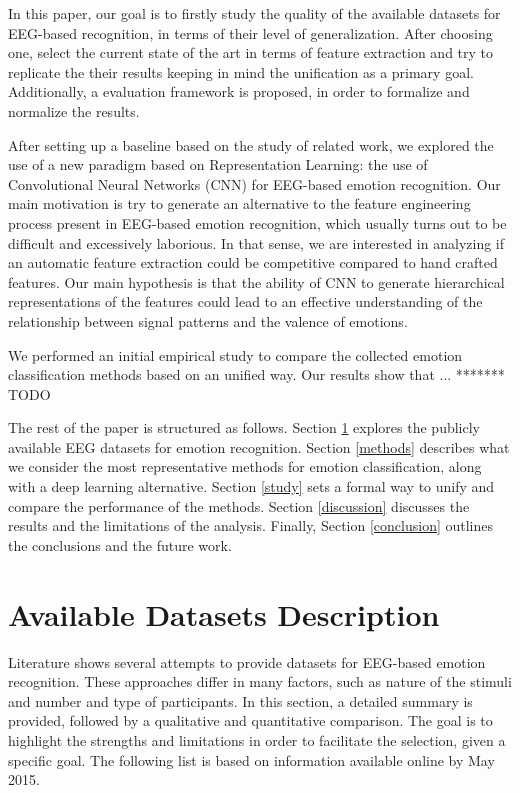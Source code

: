 \documentclass{sig-alternate}
\begin{document}
In this paper, our  goal is to firstly  study the quality of 
the available datasets for EEG-based recognition, in 
terms of their level of generalization. After choosing 
one, select the current state of the art  in terms of feature
 extraction and try to replicate the their results keeping  
 in mind the unification as a primary goal. Additionally, a 
 evaluation framework is proposed, in order to formalize 
 and normalize the results.  
 
After setting up a baseline based on the study of related 
work, we explored the use of a new paradigm  based on 
Representation Learning: the use of Convolutional Neural 
Networks (CNN) for  EEG-based emotion recognition.  Our main
motivation is try to generate an alternative to the feature 
engineering process present in EEG-based emotion recognition, 
which usually turns out to be difficult and  excessively laborious. In 
that sense, we are interested in analyzing if an automatic feature 
extraction could be competitive compared to hand crafted 
features. Our main hypothesis is that  the ability of CNN to generate 
hierarchical representations of the features could lead to an 
effective understanding of the relationship between signal patterns 
and the valence of emotions.

We performed an initial empirical study to compare the collected 
emotion classification methods based on an unified way.  Our results 
show that ... ******* TODO

The rest of the paper is structured as follows. Section \ref{data} 
explores the publicly  available EEG datasets for emotion 
recognition.  Section  \ref{methods} describes what we consider 
the most representative methods for emotion classification, along 
with a  deep learning alternative. Section \ref{study}
sets a formal way to unify and compare the performance of the 
methods. Section \ref{discussion} discusses the results and the 
limitations of the analysis. Finally, Section \ref{conclusion} outlines 
the conclusions and the future work. 

\section{Available Datasets Description}
\label{data}

Literature shows several attempts  to provide datasets for EEG-based 
emotion recognition. These approaches differ in many factors, such as  nature 
of the stimuli and number and type of participants. In this section,  a detailed 
summary is provided, followed by a qualitative and quantitative
comparison.  The goal is to highlight the strengths and limitations in order to 
facilitate the selection, given  a specific goal. The following list is based on 
information available online by May 2015.
\end{document}
